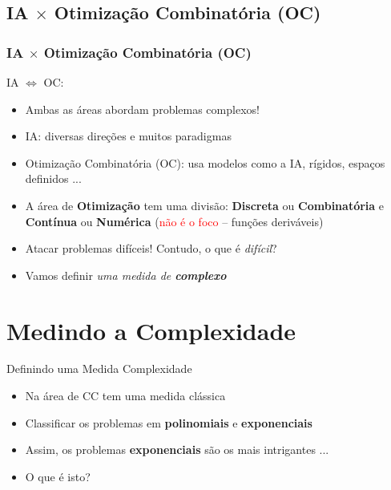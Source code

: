 \documentclass{beamer}
\begin{document}
\subsection{IA $\times $ Otimização Combinatória (OC)}

\begin{frame}[fragile]
\frametitle{IA $\times $ Otimização Combinatória (OC)}

\begin{block}{IA $\Leftrightarrow $ OC:}
  \begin{itemize}
   \item  Ambas as áreas abordam problemas complexos!

    \item IA: diversas direções e muitos paradigmas

    \item Otimização Combinatória (OC): usa modelos como a IA, rígidos, espaços definidos ...
    
        \item A área de \textbf{Otimização} tem uma divisão: \textbf{Discreta} ou \textbf{Combinatória} e 
        \textbf{Contínua} ou \textbf{Numérica} (\textcolor{red}{não é o foco} -- funções deriváveis)
        
        \item  Atacar problemas difíceis! Contudo, o que é \textit{difícil}?
        
                
       \item   Vamos definir \textit{uma medida de \textbf{complexo}}
    \end{itemize}
  
  \end{block}

\end{frame}



\section{Medindo a Complexidade}

\begin{frame}
\begin{block}{Definindo uma Medida Complexidade}
  \begin{itemize}
 
  \item Na área de CC tem uma medida clássica
  \item Classificar os problemas em \textbf{polinomiais} e \textbf{exponenciais}
     
     \item Assim, os problemas  \textbf{exponenciais} são os mais intrigantes ...
     \item O que é isto?
  \end{itemize}
\end{block}
\end{frame}
\end{document}
